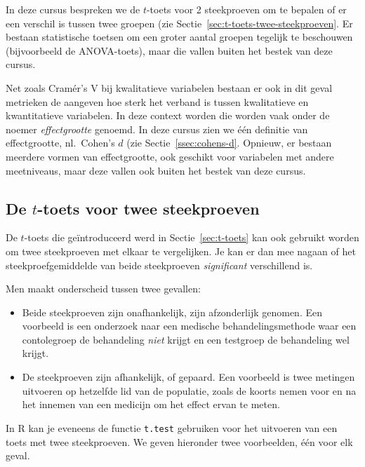 In deze cursus bespreken we de $t$-toets voor 2 steekproeven om te bepalen of er een verschil is tussen twee groepen (zie Sectie~\ref{sec:t-toets-twee-steekproeven}. Er bestaan statistische toetsen om een groter aantal groepen tegelijk te beschouwen (bijvoorbeeld de ANOVA-toets), maar die vallen buiten het bestek van deze cursus.

Net zoals Cramér's V bij kwalitatieve variabelen bestaan er ook in dit geval metrieken de aangeven hoe sterk het verband is tussen kwalitatieve en kwantitatieve variabelen. In deze context worden die worden vaak onder de noemer \emph{effectgrootte} genoemd. In deze cursus zien we één definitie van effectgrootte, nl.~Cohen's $d$ (zie Sectie~\ref{ssec:cohens-d}. Opnieuw, er bestaan meerdere vormen van effectgrootte, ook geschikt voor variabelen met andere meetniveaus, maar deze vallen ook buiten het bestek van deze cursus.

\subsection{De \texorpdfstring{$t$}{t}-toets voor twee steekproeven}
\label{ssec:t-toets-twee-steekproeven}

De $t$-toets die geïntroduceerd werd in Sectie~\ref{sec:t-toets} kan ook gebruikt worden om twee steekproeven met elkaar te vergelijken. Je kan er dan mee nagaan of het steekproefgemiddelde van beide steekproeven \emph{significant} verschillend is.

Men maakt onderscheid tussen twee gevallen:

\begin{itemize}
  \item Beide steekproeven zijn onafhankelijk, zijn afzonderlijk genomen. Een voorbeeld is een onderzoek naar een medische behandelingsmethode waar een contolegroep de behandeling \emph{niet} krijgt en een testgroep de behandeling wel krijgt.
  \item De steekproeven zijn afhankelijk, of gepaard. Een voorbeeld is twee metingen uitvoeren op hetzelfde lid van de populatie, zoals de koorts nemen voor en na het innemen van een medicijn om het effect ervan te meten.
\end{itemize}

In R kan je eveneens de functie \texttt{t.test} gebruiken voor het uitvoeren van een toets met twee steekproeven. We geven hieronder twee voorbeelden, één voor elk geval.

